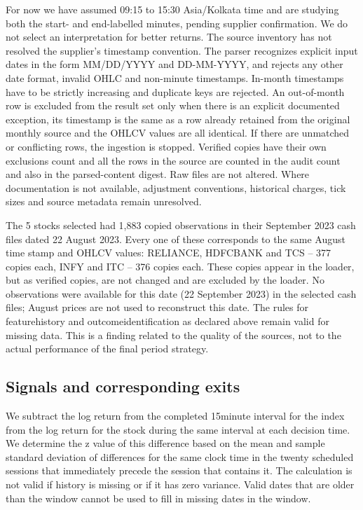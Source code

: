 \documentclass[11pt,a4paper]{article}
\begin{document}
For now we have assumed 09:15 to 15:30 Asia/Kolkata time and are studying both the start- and end-labelled minutes, pending supplier confirmation. We do not select an interpretation for better returns. The source inventory has not resolved the supplier's timestamp convention. The parser recognizes explicit input dates in the form MM/DD/YYYY and DD-MM-YYYY, and rejects any other date format, invalid OHLC and non-minute timestamps. In-month timestamps have to be strictly increasing and duplicate keys are rejected. An out-of-month row is excluded from the result set only when there is an explicit documented exception, its timestamp is the same as a row already retained from the original monthly source and the OHLCV values are all identical. If there are unmatched or conflicting rows, the ingestion is stopped. Verified copies have their own exclusions count and all the rows in the source are counted in the audit count and also in the parsed-content digest. Raw files are not altered. Where documentation is not available, adjustment conventions, historical charges, tick sizes and source metadata remain unresolved.

The 5 stocks selected had 1,883 copied observations in their September 2023 cash files dated 22 August 2023. Every one of these corresponds to the same August time stamp and OHLCV values: RELIANCE, HDFCBANK and TCS – 377 copies each, INFY and ITC – 376 copies each. These copies appear in the loader, but as verified copies, are not changed and are excluded by the loader. No observations were available for this date (22 September 2023) in the selected cash files; August prices are not used to reconstruct this date. The rules for feature\allowbreak{}history and outcome\allowbreak{}identification as declared above remain valid for missing data. This is a finding related to the quality of the sources, not to the actual performance of the final period strategy.

\subsection*{Signals and corresponding exits}

We subtract the log return from the completed 15\allowbreak{}minute interval for the index from the log return for the stock during the same interval at each decision time. We determine the z value of this difference based on the mean and sample standard deviation of differences for the same clock time in the twenty scheduled sessions that immediately precede the session that contains it. The calculation is not valid if history is missing or if it has zero variance. Valid dates that are older than the window cannot be used to fill in missing dates in the window.
\end{document}
